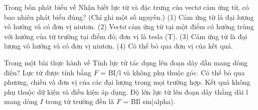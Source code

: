 \begin{ex}
Trong bốn phát biểu về Nhận biết lực từ và đặc trưng của vectơ cảm ứng từ, có bao nhiêu phát biểu đúng? (Chỉ ghi một số nguyên.) (1) Cảm ứng từ là đại lượng vô hướng và có đơn vị niutơn. (2) Vectơ cảm ứng từ tại một điểm có hướng trùng với hướng của từ trường tại điểm đó; đơn vị là tesla (T). (3) Cảm ứng từ là đại lượng vô hướng và có đơn vị niutơn. (4) Có thể bỏ qua đơn vị của kết quả.
\end{ex}

\begin{ex}
Trong một bài thực hành về Tính lực từ tác dụng lên đoạn dây dẫn mang dòng điện?
\choice
{Lực từ được tính bằng $F$ = BI/l và không phụ thuộc góc.}
{Có thể bỏ qua phương, chiều và đơn vị của các đại lượng trong mọi trường hợp.}
{Kết quả không phụ thuộc dữ kiện và điều kiện áp dụng.}
{\True Độ lớn lực từ lên đoạn dây thẳng dài l mang dòng $I$ trong từ trường đều là $F$ = BIl sin(alpha).}
\end{ex}

